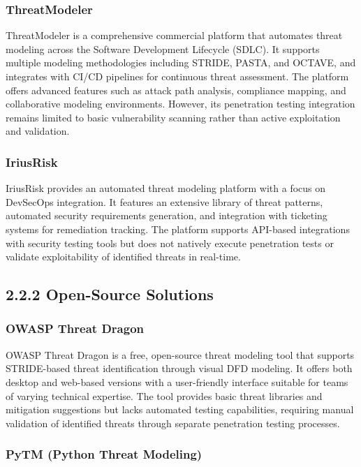 \documentclass[12pt,a4paper]{report}
\begin{document}
\subsubsection{ThreatModeler}

ThreatModeler is a comprehensive commercial platform that automates threat modeling across the Software Development Lifecycle (SDLC). It supports multiple modeling methodologies including STRIDE, PASTA, and OCTAVE, and integrates with CI/CD pipelines for continuous threat assessment. The platform offers advanced features such as attack path analysis, compliance mapping, and collaborative modeling environments. However, its penetration testing integration remains limited to basic vulnerability scanning rather than active exploitation and validation.

\subsubsection{IriusRisk}

IriusRisk provides an automated threat modeling platform with a focus on DevSecOps integration. It features an extensive library of threat patterns, automated security requirements generation, and integration with ticketing systems for remediation tracking. The platform supports API-based integrations with security testing tools but does not natively execute penetration tests or validate exploitability of identified threats in real-time.

\subsection{2.2.2 Open-Source Solutions}

\subsubsection{OWASP Threat Dragon}

OWASP Threat Dragon is a free, open-source threat modeling tool that supports STRIDE-based threat identification through visual DFD modeling. It offers both desktop and web-based versions with a user-friendly interface suitable for teams of varying technical expertise. The tool provides basic threat libraries and mitigation suggestions but lacks automated testing capabilities, requiring manual validation of identified threats through separate penetration testing processes.

\subsubsection{PyTM (Python Threat Modeling)}
\end{document}
